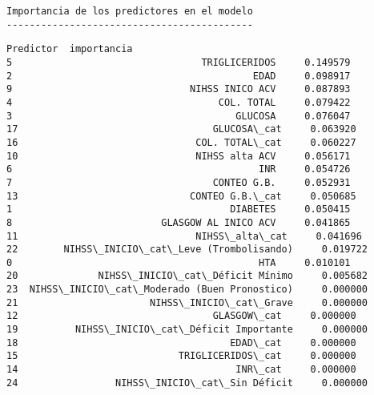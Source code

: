     \begin{Verbatim}[commandchars=\\\{\}]
Importancia de los predictores en el modelo
-------------------------------------------
    \end{Verbatim}

            \begin{tcolorbox}[breakable, size=fbox, boxrule=.5pt, pad at break*=1mm, opacityfill=0]
\begin{Verbatim}[commandchars=\\\{\}]
                                      Predictor  importancia
5                                 TRIGLICERIDOS     0.149579
2                                          EDAD     0.098917
9                               NIHSS INICO ACV     0.087893
4                                    COL. TOTAL     0.079422
3                                       GLUCOSA     0.076047
17                                  GLUCOSA\_cat     0.063920
16                               COL. TOTAL\_cat     0.060227
10                               NIHSS alta ACV     0.056171
6                                           INR     0.054726
7                                   CONTEO G.B.     0.052931
13                              CONTEO G.B.\_cat     0.050685
1                                      DIABETES     0.050415
8                          GLASGOW AL INICO ACV     0.041865
11                               NIHSS\_alta\_cat     0.041696
22        NIHSS\_INICIO\_cat\_Leve (Trombolisando)     0.019722
0                                           HTA     0.010101
20              NIHSS\_INICIO\_cat\_Déficit Mínimo     0.005682
23  NIHSS\_INICIO\_cat\_Moderado (Buen Pronostico)     0.000000
21                       NIHSS\_INICIO\_cat\_Grave     0.000000
12                                  GLASGOW\_cat     0.000000
19          NIHSS\_INICIO\_cat\_Déficit Importante     0.000000
18                                     EDAD\_cat     0.000000
15                            TRIGLICERIDOS\_cat     0.000000
14                                      INR\_cat     0.000000
24                 NIHSS\_INICIO\_cat\_Sin Déficit     0.000000
\end{Verbatim}
\end{tcolorbox}
        
